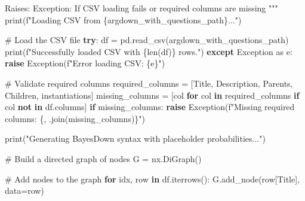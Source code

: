 \documentclass[
  11pt,
  letterpaper,
]{book}
\newenvironment{Shaded}{\begin{snugshade}}{\end{snugshade}}
\newcommand{\BuiltInTok}[1]{\textcolor[rgb]{0.00,0.23,0.31}{#1}}
\newcommand{\CommentTok}[1]{\textcolor[rgb]{0.37,0.37,0.37}{#1}}
\newcommand{\ControlFlowTok}[1]{\textcolor[rgb]{0.00,0.23,0.31}{\textbf{#1}}}
\newcommand{\ImportTok}[1]{\textcolor[rgb]{0.00,0.46,0.62}{#1}}
\newcommand{\KeywordTok}[1]{\textcolor[rgb]{0.00,0.23,0.31}{\textbf{#1}}}
\newcommand{\NormalTok}[1]{\textcolor[rgb]{0.00,0.23,0.31}{#1}}
\newcommand{\OperatorTok}[1]{\textcolor[rgb]{0.37,0.37,0.37}{#1}}
\newcommand{\PreprocessorTok}[1]{\textcolor[rgb]{0.68,0.00,0.00}{#1}}
\newcommand{\SpecialCharTok}[1]{\textcolor[rgb]{0.37,0.37,0.37}{#1}}
\newcommand{\SpecialStringTok}[1]{\textcolor[rgb]{0.13,0.47,0.30}{#1}}
\newcommand{\StringTok}[1]{\textcolor[rgb]{0.13,0.47,0.30}{#1}}
\begin{document}
\begin{Shaded}
\begin{Highlighting}[]
\CommentTok{  Raises:}
\CommentTok{      Exception: If CSV loading fails or required columns are missing}
\CommentTok{  """}
  \BuiltInTok{print}\NormalTok{(}\SpecialStringTok{f"Loading CSV from }\SpecialCharTok{\{}\NormalTok{argdown\_with\_questions\_path}\SpecialCharTok{\}}\SpecialStringTok{..."}\NormalTok{)}

  \CommentTok{\# Load the CSV file}
  \ControlFlowTok{try}\NormalTok{:}
\NormalTok{      df }\OperatorTok{=}\NormalTok{ pd.read\_csv(argdown\_with\_questions\_path)}
      \BuiltInTok{print}\NormalTok{(}\SpecialStringTok{f"Successfully loaded CSV with }\SpecialCharTok{\{}\BuiltInTok{len}\NormalTok{(df)}\SpecialCharTok{\}}\SpecialStringTok{ rows."}\NormalTok{)}
  \ControlFlowTok{except} \PreprocessorTok{Exception} \ImportTok{as}\NormalTok{ e:}
      \ControlFlowTok{raise} \PreprocessorTok{Exception}\NormalTok{(}\SpecialStringTok{f"Error loading CSV: }\SpecialCharTok{\{}\NormalTok{e}\SpecialCharTok{\}}\SpecialStringTok{"}\NormalTok{)}

  \CommentTok{\# Validate required columns}
\NormalTok{  required\_columns }\OperatorTok{=}\NormalTok{ [}\StringTok{\textquotesingle{}Title\textquotesingle{}}\NormalTok{, }\StringTok{\textquotesingle{}Description\textquotesingle{}}\NormalTok{, }\StringTok{\textquotesingle{}Parents\textquotesingle{}}\NormalTok{, }\StringTok{\textquotesingle{}Children\textquotesingle{}}\NormalTok{, }\StringTok{\textquotesingle{}instantiations\textquotesingle{}}\NormalTok{]}
\NormalTok{  missing\_columns }\OperatorTok{=}\NormalTok{ [col }\ControlFlowTok{for}\NormalTok{ col }\KeywordTok{in}\NormalTok{ required\_columns }\ControlFlowTok{if}\NormalTok{ col }\KeywordTok{not} \KeywordTok{in}\NormalTok{ df.columns]}
  \ControlFlowTok{if}\NormalTok{ missing\_columns:}
      \ControlFlowTok{raise} \PreprocessorTok{Exception}\NormalTok{(}\SpecialStringTok{f"Missing required columns: }\SpecialCharTok{\{}\StringTok{\textquotesingle{}, \textquotesingle{}}\SpecialCharTok{.}\NormalTok{join(missing\_columns)}\SpecialCharTok{\}}\SpecialStringTok{"}\NormalTok{)}

  \BuiltInTok{print}\NormalTok{(}\StringTok{"Generating BayesDown syntax with placeholder probabilities..."}\NormalTok{)}

  \CommentTok{\# Build a directed graph of nodes}
\NormalTok{  G }\OperatorTok{=}\NormalTok{ nx.DiGraph()}

  \CommentTok{\# Add nodes to the graph}
  \ControlFlowTok{for}\NormalTok{ idx, row }\KeywordTok{in}\NormalTok{ df.iterrows():}
\NormalTok{      G.add\_node(row[}\StringTok{\textquotesingle{}Title\textquotesingle{}}\NormalTok{], data}\OperatorTok{=}\NormalTok{row)}


\end{Highlighting}
\end{Shaded}
\end{document}
